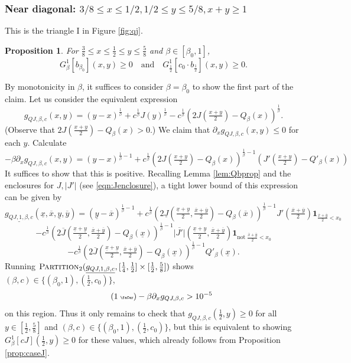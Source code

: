 \documentclass[12pt]{amsart}
\theoremstyle{plain}
\newtheorem{prop}[thm]{Proposition}
\newcommand{\auto}{\tag{\addtocounter{equation}{1}\theequation\;{\tiny\faCar}}}
\theoremstyle{definition}
\theoremstyle{remark}
\numberwithin{equation}{section}
\begin{document}
\subsubsection{Near diagonal: $3/8\leq x\leq 1/2, 1/2\leq y\leq 5/8, x+y\geq 1$}
This is the triangle I in Figure \ref{fig:qj}.
\label{sec:QJ-I}

\begin{prop}
For $\frac38\le x\le \frac12\le y\le \frac58$ and $\beta\in [\beta_0,1]$, 
\[ G^1_{\beta}[b_{\beta_0}](x,y)\ge 0\quad\text{and}\quad G_{\frac12}^1[c_0\cdot b_{\frac12}](x,y)\ge 0. \]
\end{prop}
By monotonicity in $\beta$, it suffices to consider $\beta=\beta_0$ to show the first part of the claim.
Let us consider the equivalent expression
\[ g_{QJ,\beta,c}(x,y)=(y-x)^{\frac1\beta} +c^{\frac1\beta} J(y)^{\frac1\beta}-c^{\frac1\beta}(2 J(\tfrac{x+y}{2})-Q_\beta(x))^{\frac1\beta}.\]
(Observe that $2J(\tfrac{x + y}2) - Q_\beta(x)>0$.)  
We claim that $\partial_x g_{QJ,\beta,c}(x,y)\leq 0$ for each $y$. Calculate
\[-\beta \partial_x g_{QJ,\beta,c}(x,y) = (y-x)^{\frac{1}{\beta}-1}+c^{\frac1\beta}(2J(\tfrac{x+y}{2})-Q_\beta(x))^{\frac1\beta-1} (J'(\tfrac{x+y}{2})-Q'_\beta(x))\]
It suffices to show that this is positive.
Recalling Lemma \ref{lem:Qbprop} and the enclosures for $J, |J'|$ (see \eqref{eqn:Jenclosure}), a tight lower bound of this expression can be given by
\[ \underline{g_{QJ,1,\beta,c}}(\underline{x},\overline{x},\underline{y},\overline{y}) 
=(\underline{y}-\overline{x})^{\frac1\beta-1}+c^{\frac1\beta}(2\underline{J}(\tfrac{\underline{x}+\underline{y}}2,\tfrac{\overline{x}+\overline{y}}2)-Q_\beta(\overline{x}))^{\tfrac1\beta-1} J'(\tfrac{\overline{x}+\overline{y}}2)\mathbf{1}_{\frac{\overline{x}+\overline{y}}{2}<x_0} 
\]
\[ - c^{\frac1\beta}(2\overline{J}(\tfrac{\underline{x}+\underline{y}}2,\tfrac{\overline{x}+\overline{y}}2)-Q_\beta(\underline{x}))^{\tfrac1\beta-1} \overline{|J'|}(\tfrac{\underline{x}+\underline{y}}2,\tfrac{\overline{x}+\overline{y}}2)\mathbf{1}_{\text{not}\;\frac{\overline{x}+\overline{y}}{2}<x_0}  \]
\[ - c^{\frac1\beta} (2\overline{J}(\tfrac{\underline{x}+\underline{y}}2,\tfrac{\overline{x}+\overline{y}}2)-Q_\beta(\underline{x}))^{\tfrac1\beta-1}Q'_\beta(\underline{x}). \]
Running $\textsc{Partition}_2(\underline{g_{QJ,1,\beta,c}},[\frac14,\frac12]\times [\frac12,\frac58])$ shows  $(\beta,c)\in \{(\beta_0,1),(\frac12,c_0)\}$,
\begin{equation}\label{eqn:g_QJ_1_auto}\auto
-\beta\partial_x g_{QJ,\beta,c} > 10^{-5}
\end{equation}
on this region.
Thus it only remains to check that
$g_{QJ,\beta,c}(\tfrac12, y)\ge 0$
for all $y\in [\tfrac12,\tfrac58]$ and $(\beta,c)\in \{(\beta_0,1),(\frac12,c_0)\}$, but this is equivalent to showing $G^1_\beta[c J](\frac12,y)\ge 0$ for these values, which already follows from Proposition \ref{prop:caseJ}. 
\end{document}
